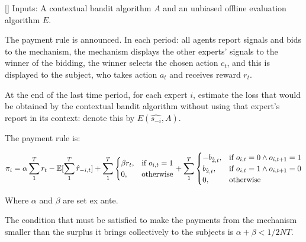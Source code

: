 \begin{mech}\label{mech:bidbandit}[]
Inputs: A contextual bandit algorithm $A$ and an unbiased offline evaluation algorithm $E$.


The payment rule is announced.
 In each period: all agents report signals and bids to the mechanism, the mechanism displays the other experts' signals to the winner of the bidding, the winner selects the chosen action $c_t$, and this is displayed to the subject, who takes action $a_t$ and receives reward $r_t$.

At the end of the last time period, for each expert $i$, estimate the loss that would be obtained by the contextual bandit algorithm without using that expert's report in its context: denote this by $E(\hat{s_{-i}},A)$.

The payment rule is:

\[
    \pi_i = 
\alpha \sum_1^T r_t -  \expec[\sum_1^T \hat{r}_{-i,t}]
+
\sum_1^T
\begin{cases}
    \beta r_t ,& \text{if } o_{i,t} = 1\\
     0,              & \text{otherwise}
\end{cases}
+
\sum_1^T
\begin{cases}
     - b_{\hat{2},t} ,& \text{if } o_{i,t} = 0 \land o_{i,t+1} = 1\\
       b_{\hat{2},t} ,& \text{if } o_{i,t} = 1 \land o_{i,t+1} = 0 \\
	   0,              & \text{otherwise}
\end{cases}
\]

Where $\alpha$ and $\beta$ are set ex ante. 
\end{mech}


The condition that must be satisfied to make the payments from the mechanism smaller than the surplus it brings collectively to the subjects is $ \alpha + \beta < 1/2NT$.





